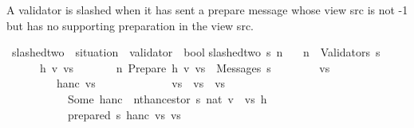 \documentclass{beamer}
\begin{document}
\begin{frame}
\begin{isamarkuptext}%
[ii] A validator is slashed when it has sent a prepare message whose
      view src is not -1 but has no supporting preparation in the view src.%
\end{isamarkuptext}\isamarkuptrue%
\isamarkupfalse%
\ slashed{\isacharunderscore}two\ {\isacharcolon}{\isacharcolon}\ {\isachardoublequoteopen}situation\ {\isasymRightarrow}\ validator\ {\isasymRightarrow}\ bool{\isachardoublequoteclose}\isanewline
{}\isanewline
{\isachardoublequoteopen}slashed{\isacharunderscore}two\ s\ n\ {\isacharequal}\isanewline
\ \ {\isacharparenleft}n\ {\isasymin}\ Validators\ s\ {\isasymand}\isanewline
\ \ \ \ \ {\isacharparenleft}{\isasymexists}\ h\ v\ vs{\isachardot}\isanewline
\ \ \ \ \ \ \ {\isacharparenleft}{\isacharparenleft}n{\isacharcomma}\ Prepare\ {\isacharparenleft}h{\isacharcomma}\ v{\isacharcomma}\ vs{\isacharparenright}{\isacharparenright}\ {\isasymin}\ Messages\ s\ {\isasymand}\isanewline
\ \ \ \ \ \ \ vs\ {\isasymnoteq}\ {\isacharminus}{}\ {\isasymand}\isanewline
\ \ \ \ \ \ \ {\isacharparenleft}{\isasymnot}\ {\isacharparenleft}{\isasymexists}\ h{\isacharunderscore}anc\ vs{\isacharprime}{\isachardot}\isanewline
\ \ \ \ \ \ \ \ \ \ \ {\isacharminus}{}\ {\isasymle}\ vs{\isacharprime}\ {\isasymand}\ vs{\isacharprime}\ {\isacharless}\ vs\ {\isasymand}\isanewline
\ \ \ \ \ \ \ \ \ \ \ Some\ h{\isacharunderscore}anc\ {\isacharequal}\ nth{\isacharunderscore}ancestor\ s\ {\isacharparenleft}nat\ {\isacharparenleft}v\ {\isacharminus}\ vs{\isacharparenright}{\isacharparenright}\ h\ {\isasymand}\isanewline
\ \ \ \ \ \ \ \ \ \ \ prepared\ s\ h{\isacharunderscore}anc\ vs\ vs{\isacharprime}{\isacharparenright}{\isacharparenright}{\isacharparenright}{\isacharparenright}{\isacharparenright}{\isachardoublequoteclose}%
\end{frame}
\end{document}
